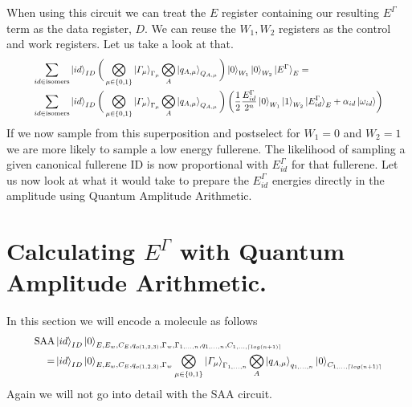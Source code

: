 \vspace{\baselineskip}
When using this circuit we can treat the $E$ register containing our resulting $E^\Gamma$ term as the data register, $D$. We can reuse the $W_1,W_2$ registers as the control and work registers. Let us take a look at that.
\begin{equation}
   \resizebox{.9\hsize}{!}{$\begin{split}
       \sum_{id\in \text{isomers}}&\ket{id}_{ID}\bigg(\bigotimes_{\mu\in \{0,1\}}\ket{\varGamma_\mu}_{\Gamma_\mu}\bigotimes_{A}\ket{q_{A,\mu}}_{Q_{A,\mu}}\bigg)\ket{0}_{W_1}\ket{0}_{W_2}\ket{E^\Gamma}_E =\\ 
       \sum_{id\in \text{isomers}}&\ket{id}_{ID}\bigg(\bigotimes_{\mu\in \{0,1\}}\ket{\varGamma_\mu}_{\Gamma_\mu}\bigotimes_{A}\ket{q_{A,\mu}}_{Q_{A,\mu}}\bigg)\left(\frac{1}{2}\frac{E^\Gamma_{id}}{2^n}\ket{0}_{W_1}\ket{1}_{W_2}\ket{E^\Gamma_{id}}_E+\alpha_{id}\ket{\omega_{id}}\right) \\ 
   \end{split}$}
\end{equation}
If we now sample from this superposition and postselect for $W_1 = 0$ and $W_2 = 1$ we are more likely to sample a low energy fullerene. The likelihood of sampling a given canonical fullerene ID is now proportional with $E^\Gamma_{id}$ for that fullerene.
Let us now look at what it would take to prepare the $E^\Gamma_{id}$ energies directly in the amplitude using Quantum Amplitude Arithmetic. 


\section{Calculating $E^\Gamma$ with Quantum Amplitude Arithmetic.}
In this section we will encode a molecule as follows
\begin{equation}
   \resizebox{.9\hsize}{!}{$\begin{split}
       \text{SAA}&\ket{id}_{ID}\ket{0}_{E,E_w,C_E,q_{o(1,2,3)},\Gamma_w,\Gamma_{1,\dots,n},q_{1,\dots,n},C_{1,\dots,\lceil log(n+1) \rceil}}\\
       =&\ket{id}_{ID}\ket{0}_{E,E_w,C_E,q_{o(1,2,3)},\Gamma_w}\bigotimes_{\mu\in\{0,1\}}\ket{\varGamma_\mu}_{\Gamma_{1,\dots,n}}\bigotimes_{A}\ket{q_{A,\mu}}_{q_{1,\dots,n}}\ket{0}_{C_{1,\dots,\lceil log(n+1) \rceil}}
   \end{split}$}
\end{equation}
Again we will not go into detail with the SAA circuit.

